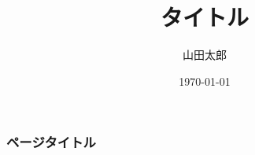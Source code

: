 \documentclass[14pt,dvipdfmx]{beamer}
\title[タイトル略]{タイトル}
\author[Yamada]{山田太郎}
\date[\today]{\small\today}
\institute[大学名略]{大学名 \and 研究室名}
\begin{document}
\frame{\maketitle}

\begin{frame}\frametitle{ページタイトル}
\end{frame}
\end{document}
